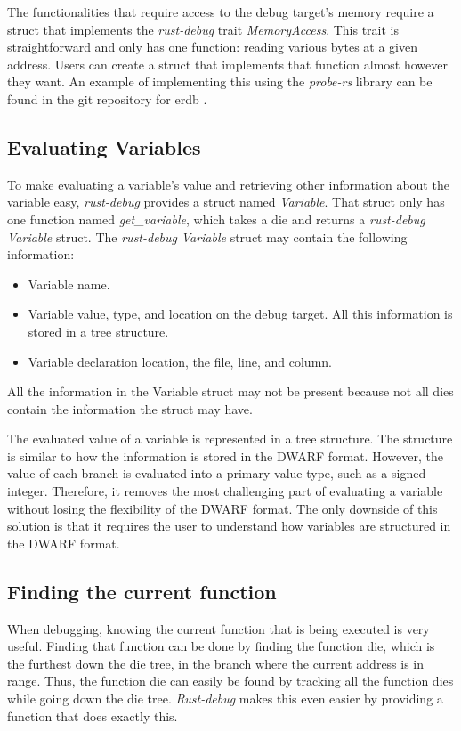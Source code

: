 The functionalities that require access to the debug target's memory require a struct that implements the \emph{rust-debug} trait \emph{MemoryAccess}.
This trait is straightforward and only has one function: reading various bytes at a given address.
Users can create a struct that implements that function almost however they want.
An example of implementing this using the \emph{probe-rs} library can be found in the git repository for \gls{erdb} \cite{erdb}.



\subsection{Evaluating Variables} \label{sec:ievalvar}
To make evaluating a variable's value and retrieving other information about the variable easy, \emph{rust-debug} provides a struct named \emph{Variable}.
That struct only has one function named \emph{get\_variable}, which takes a \gls{die} and returns a \emph{rust-debug} \emph{Variable} struct.
The \emph{rust-debug} \emph{Variable} struct may contain the following information:


\begin{itemize}
  \item Variable name.
  \item Variable value, type, and location on the debug target. All this information is stored in a tree structure.
  \item Variable declaration location, the file, line, and column.
\end{itemize}


All the information in the Variable struct may not be present because not all \glspl{die} contain the information the struct may have.


The evaluated value of a variable is represented in a tree structure.
The structure is similar to how the information is stored in the \gls{DWARF} format.
However, the value of each branch is evaluated into a primary value type, such as a signed integer.
Therefore, it removes the most challenging part of evaluating a variable without losing the flexibility of the \gls{DWARF} format.
The only downside of this solution is that it requires the user to understand how variables are structured in the \gls{DWARF} format.


\subsection{Finding the current function} \label{sec:funcdie}
When debugging, knowing the current function that is being executed is very useful.
Finding that function can be done by finding the function \gls{die}, which is the furthest down the \gls{die} tree, in the branch where the current address is in range.
Thus, the function \gls{die} can easily be found by tracking all the function \glspl{die} while going down the \gls{die} tree.
\emph{Rust-debug} makes this even easier by providing a function that does exactly this.



